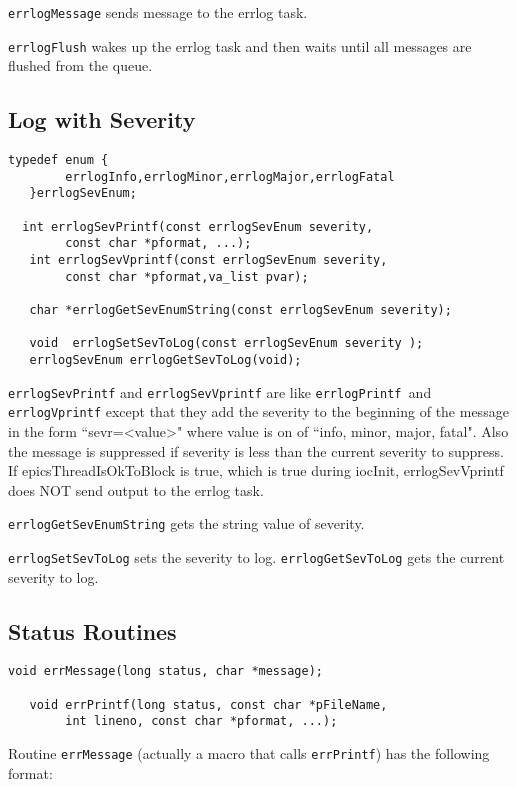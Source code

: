 \verb|errlogMessage| sends message to the errlog task.

\verb|errlogFlush| wakes up the errlog task and then waits until all messages are flushed from the queue.

\subsection{Log with Severity}

\begin{verbatim}typedef enum {
        errlogInfo,errlogMinor,errlogMajor,errlogFatal
   }errlogSevEnum;

  int errlogSevPrintf(const errlogSevEnum severity,
        const char *pformat, ...);
   int errlogSevVprintf(const errlogSevEnum severity,
        const char *pformat,va_list pvar);

   char *errlogGetSevEnumString(const errlogSevEnum severity);

   void  errlogSetSevToLog(const errlogSevEnum severity );
   errlogSevEnum errlogGetSevToLog(void);
\end{verbatim}
\verb|errlogSevPrintf| and \verb|errlogSevVprintf| are like \verb|errlogPrintf |and  \verb|errlogVprintf| except that they 
add the severity to the beginning of the message in the form ``sevr=\textless{}value\textgreater{}" where value is on of ``info, minor, major, 
fatal". Also the message is suppressed if  severity is less than the current severity to suppress. If epicsThreadIsOkToBlock 
is true, which is true during iocInit, errlogSevVprintf does NOT send output to the errlog task.

\verb|errlogGetSevEnumString| gets the string value of severity. 

 \verb|errlogSetSevToLog| sets the severity to log. \verb|errlogGetSevToLog| gets the current severity to log.

\subsection{Status Routines }

\begin{verbatim}void errMessage(long status, char *message);

   void errPrintf(long status, const char *pFileName,
        int lineno, const char *pformat, ...);
\end{verbatim}
Routine \verb|errMessage| (actually a macro that calls \verb|errPrintf|) has the following format:

